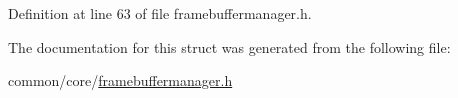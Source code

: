Definition at line 63 of file framebuffermanager.\+h.


\begin{DoxyCode}{0}
\end{DoxyCode}


The documentation for this struct was generated from the following file\+:\begin{DoxyCompactItemize}
\item 
common/core/\mbox{\hyperlink{framebuffermanager_8h}{framebuffermanager.\+h}}\end{DoxyCompactItemize}
